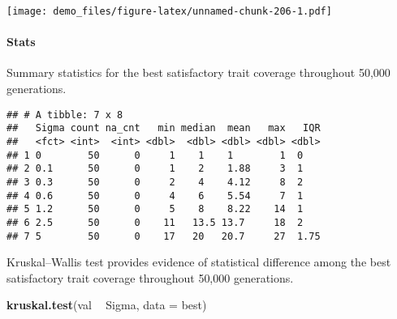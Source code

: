 \documentclass[]{book}
\newenvironment{Shaded}{\begin{snugshade}}{\end{snugshade}}
\newcommand{\DataTypeTok}[1]{\textcolor[rgb]{0.13,0.29,0.53}{#1}}
\newcommand{\KeywordTok}[1]{\textcolor[rgb]{0.13,0.29,0.53}{\textbf{#1}}}
\newcommand{\NormalTok}[1]{#1}
\newcommand{\OperatorTok}[1]{\textcolor[rgb]{0.81,0.36,0.00}{\textbf{#1}}}
\newcommand{\OtherTok}[1]{\textcolor[rgb]{0.56,0.35,0.01}{#1}}
\newcommand{\StringTok}[1]{\textcolor[rgb]{0.31,0.60,0.02}{#1}}
\let\oldparagraph\paragraph
\renewcommand{\paragraph}[1]{\oldparagraph{#1}\mbox{}}
\begin{document}
\texttt{[image: demo\_files/figure-latex/unnamed-chunk-206-1.pdf]}

\hypertarget{stats-39}{%
\paragraph{Stats}\label{stats-39}}

Summary statistics for the best satisfactory trait coverage throughout 50,000 generations.

\begin{Shaded}
\end{Shaded}

\begin{verbatim}
## # A tibble: 7 x 8
##   Sigma count na_cnt   min median  mean   max   IQR
##   <fct> <int>  <int> <dbl>  <dbl> <dbl> <dbl> <dbl>
## 1 0        50      0     1    1    1        1  0   
## 2 0.1      50      0     1    2    1.88     3  1   
## 3 0.3      50      0     2    4    4.12     8  2   
## 4 0.6      50      0     4    6    5.54     7  1   
## 5 1.2      50      0     5    8    8.22    14  1   
## 6 2.5      50      0    11   13.5 13.7     18  2   
## 7 5        50      0    17   20   20.7     27  1.75
\end{verbatim}

Kruskal--Wallis test provides evidence of statistical difference among the best satisfactory trait coverage throughout 50,000 generations.

\begin{Shaded}
\begin{Highlighting}[]
\KeywordTok{kruskal.test}\NormalTok{(val }\OperatorTok{~}\StringTok{ }\NormalTok{Sigma, }\DataTypeTok{data =}\NormalTok{ best)}
\end{Highlighting}
\end{Shaded}
\end{document}
